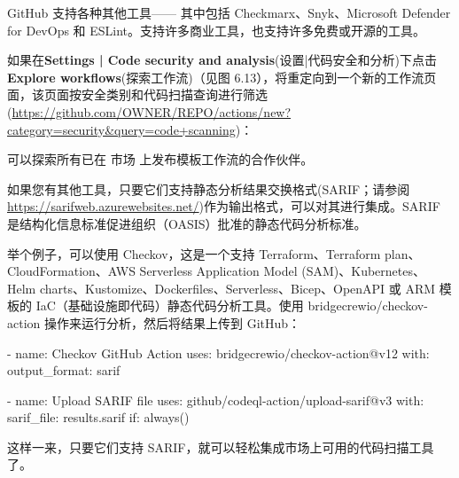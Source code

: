 
GitHub 支持各种其他工具—— 其中包括 Checkmarx、Snyk、Microsoft Defender for DevOps 和 ESLint。支持许多商业工具，也支持许多免费或开源的工具。

如果在\textbf{Settings | Code security and analysis}(设置|代码安全和分析)下点击\textbf{Explore workflows}(探索工作流)（见图 6.13），将重定向到一个新的工作流页面，该页面按安全类别和代码扫描查询进行筛选(\url{https://github.com/OWNER/REPO/actions/new?category=security&query=code+scanning})：


可以探索所有已在 市场 上发布模板工作流的合作伙伴。

如果您有其他工具，只要它们支持静态分析结果交换格式(SARIF；请参阅 \url{https://sarifweb.azurewebsites.net/})作为输出格式，可以对其进行集成。SARIF 是结构化信息标准促进组织（OASIS）批准的静态代码分析标准。

举个例子，可以使用 Checkov，这是一个支持 Terraform、Terraform plan、CloudFormation、AWS Serverless Application Model (SAM)、Kubernetes、Helm charts、Kustomize、Dockerfiles、Serverless、Bicep、OpenAPI 或 ARM 模板的 IaC（基础设施即代码）静态代码分析工具。使用 bridgecrewio/checkov-action 操作来运行分析，然后将结果上传到 GitHub：

\begin{shell}
- name: Checkov GitHub Action
  uses: bridgecrewio/checkov-action@v12
  with:
    output_format: sarif

- name: Upload SARIF file
  uses: github/codeql-action/upload-sarif@v3
  with:
    sarif_file: results.sarif
  if: always()
\end{shell}

这样一来，只要它们支持 SARIF，就可以轻松集成市场上可用的代码扫描工具了。












